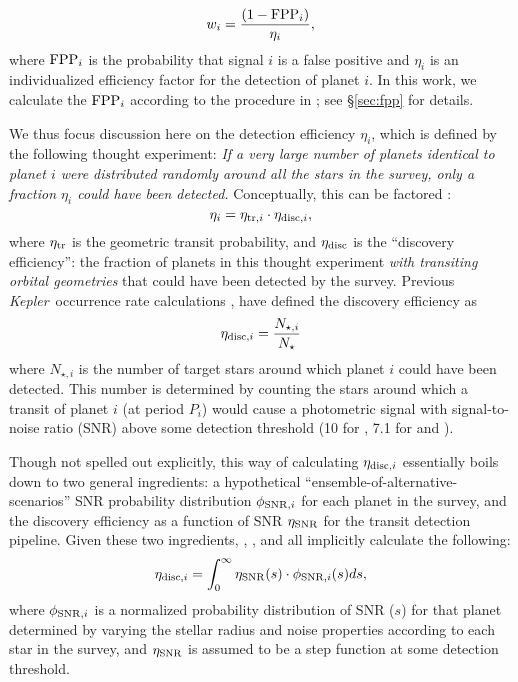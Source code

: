 \documentclass[iop]{emulateapj}
\def\Kepler{\textit{Kepler}}
\begin{document}
\begin{equation}
\label{eq:weightsimple}
w_i = \frac{(1-{\rm FPP}_i)}{\eta_i},
\end{equation}
where ${\rm FPP}_i$ is the probability that signal $i$ is a false positive and $\eta_i$ is an individualized efficiency factor for the detection of planet $i$.  In this work, we calculate the ${\rm FPP}_i$ according to the procedure in \citet{morton2012}; see \S\ref{sec:fpp} for details. 


We thus focus discussion here on the detection efficiency $\eta_i$, which is defined by the following thought experiment:  \emph{If a very large number of planets identical to planet $i$ were distributed randomly around all the stars in the survey, only a fraction $\eta_i$ could have been detected.}  Conceptually, this can be factored \citep[following][]{youdin2011}:
\begin{equation}
\label{eq:etafactored}
\eta_i = \eta_{{\rm tr},i} \cdot \eta_{{\rm disc},i},
\end{equation} 
where $\eta_{\rm tr}$ is the geometric transit probability, and $\eta_{\rm disc}$ is the ``discovery efficiency'': the fraction of planets in this thought experiment \emph{with transiting orbital geometries} that could have been detected by the survey. Previous \Kepler\ occurrence rate calculations \citep{howard2012,swift2013,dressing2013}, have defined the discovery efficiency as
\begin{equation}
\label{eq:Nstar}
\eta_{{\rm disc},i} = \frac{N_{\star,i}}{N_{\star}}
\end{equation}
where $N_{\star,i}$ is the number of target stars around which planet $i$ could have been detected.  This number is determined by counting the stars around which a transit of planet $i$ (at period $P_i$) would cause a photometric signal with signal-to-noise ratio (SNR) above some detection threshold (10 for \citet{howard2012}, 7.1 for \citet{dressing2013} and \citet{swift2013}).  

Though not spelled out explicitly, this way of calculating $\eta_{{\rm disc},i}$ essentially boils down to two general ingredients:  a hypothetical ``ensemble-of-alternative-scenarios'' SNR probability distribution $\phi_{{\rm SNR},i}$ for each planet in the survey, and the discovery efficiency as a function of SNR $\eta_{\rm SNR}$ for the transit detection pipeline.  Given these two ingredients, \citet{howard2012}, \citet{dressing2013}, and \citet{swift2013} all implicitly calculate the following:
\begin{equation}
\label{eq:etadisc}
\eta_{{\rm disc},i} = \int_0^\infty  \eta_{\rm SNR}(s) \cdot \phi_{{\rm SNR},i}(s) ds,
\end{equation} 
where $\phi_{{\rm SNR},i}$ is a normalized probability distribution of SNR ($s$) for that planet determined by varying the stellar radius and noise properties according to each star in the survey, and $\eta_{\rm SNR}$ is assumed to be a step function at some detection threshold.
\end{document}
